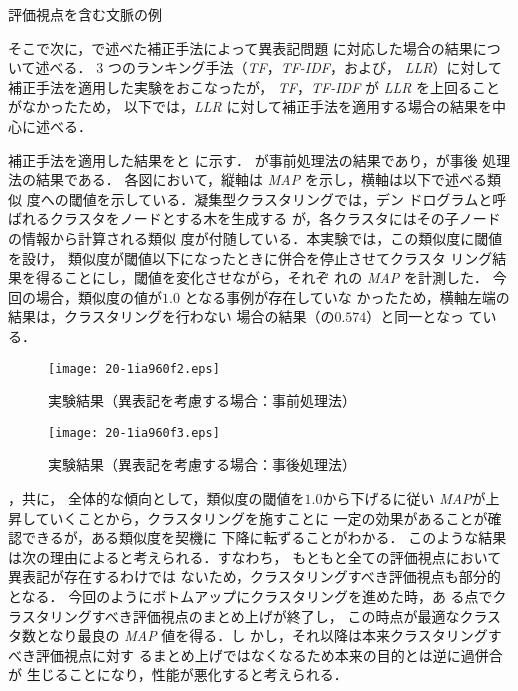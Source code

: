 \documentclass[japanese]{jnlp_1.4}
\def\sec#1{}
\def\fig#1{}
\def\tab#1{}
\begin{document}
\begin{table}[t]
 \caption{評価視点を含む文脈の例}
 \label{tab:ranking_top_example}

\end{table}

そこで次に，\sec{cl}で述べた補正手法によって異表記問題
に対応した場合の結果について述べる．
3 つのランキング手法（\textit{TF}，\textit{TF-IDF}，および，
\textit{LLR}）に対して補正手法を適用した実験をおこなったが，
\textit{TF}，\textit{TF-IDF} が \textit{LLR} を上回ることがなかったため，
以下では，\textit{LLR} に対して補正手法を適用する場合の結果を中
心に述べる．

補正手法を適用した結果を\fig{ranking_result_be}と
\fig{ranking_result_af}に示す．\fig{ranking_result_be}
が事前処理法の結果であり，\fig{ranking_result_af}が事後
処理法の結果である．
各図において，縦軸は \textit{MAP} を示し，横軸は以下で述べる類似
度への閾値を示している．凝集型クラスタリングでは，デン
ドログラムと呼ばれるクラスタをノードとする木を生成する
が，各クラスタにはその子ノードの情報から計算される類似
度が付随している．本実験では，この類似度に閾値を設け，
類似度が閾値以下になったときに併合を停止させてクラスタ
リング結果を得ることにし，閾値を変化させながら，それぞ
れの \textit{MAP} を計測した．
今回の場合，類似度の値が$1.0$ となる事例が存在していな
かったため，横軸左端の結果は，クラスタリングを行わない
場合の結果（\tab{ranking_result}の$0.574$）と同一となっ
ている．

\begin{figure}[t]
 \begin{center}
 \texttt{[image: 20-1ia960f2.eps]}
 \end{center}
 \caption{実験結果（異表記を考慮する場合：事前処理法）}
 \label{fig:ranking_result_be}
\end{figure}
\begin{figure}[t]
 \begin{center}
 \texttt{[image: 20-1ia960f3.eps]}
 \end{center}
 \caption{実験結果（異表記を考慮する場合：事後処理法）}
 \label{fig:ranking_result_af}
\end{figure}

\fig{ranking_result_be}，\fig{ranking_result_af}共に，
全体的な傾向として，類似度の閾値を$1.0$から下げるに従い
\textit{MAP}が上昇していくことから，クラスタリングを施すことに
一定の効果があることが確認できるが，ある類似度を契機に
下降に転ずることがわかる．
このような結果は次の理由によると考えられる．すなわち，
もともと全ての評価視点において異表記が存在するわけでは
ないため，クラスタリングすべき評価視点も部分的となる．
今回のようにボトムアップにクラスタリングを進めた時，あ
る点でクラスタリングすべき評価視点のまとめ上げが終了し，
この時点が最適なクラスタ数となり最良の \textit{MAP} 値を得る．し
かし，それ以降は本来クラスタリングすべき評価視点に対す
るまとめ上げではなくなるため本来の目的とは逆に過併合が
生じることになり，性能が悪化すると考えられる．
\end{document}
